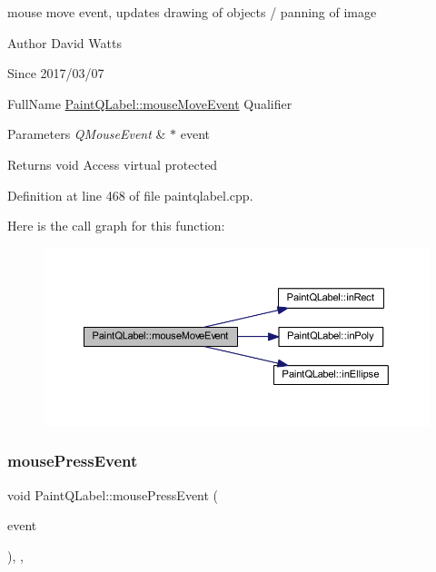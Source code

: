 mouse move event, updates drawing of objects / panning of image

\begin{DoxyAuthor}{Author}
David Watts 
\end{DoxyAuthor}
\begin{DoxySince}{Since}
2017/03/07
\end{DoxySince}
Full\+Name \hyperlink{class_paint_q_label_ae91b4ba28c7f30de7bfe0ece3011b8d6}{Paint\+Q\+Label\+::mouse\+Move\+Event} Qualifier 
\begin{DoxyParams}{Parameters}
{\em Q\+Mouse\+Event} & $\ast$ event \\
\hline
\end{DoxyParams}
\begin{DoxyReturn}{Returns}
void Access virtual protected 
\end{DoxyReturn}


Definition at line 468 of file paintqlabel.\+cpp.

Here is the call graph for this function\+:
\nopagebreak
\begin{figure}[H]
\begin{center}
\leavevmode
\includegraphics[width=350pt]{class_paint_q_label_ae91b4ba28c7f30de7bfe0ece3011b8d6_cgraph}
\end{center}
\end{figure}
\mbox{\label{class_paint_q_label_a222bf479767638c91bb0b8b655e9794b}} 
\subsubsection{\texorpdfstring{mouse\+Press\+Event}{mousePressEvent}}
{\footnotesize\ttfamily void Paint\+Q\+Label\+::mouse\+Press\+Event (\begin{DoxyParamCaption}\item[{Q\+Mouse\+Event $\ast$}]{event }\end{DoxyParamCaption})\hspace{0.3cm}{\ttfamily [protected]}, {\ttfamily [virtual]}, {\ttfamily [slot]}}

